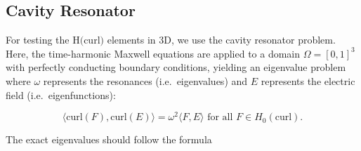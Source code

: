 \documentclass[manuscript,screen]{acmart}
\newcommand{\R}{\mathbb{R}}
\newcommand{\akg}[1]{\textcolor{blue}{\textbf{AG:} #1}}
\begin{document}


  \subsection{Cavity Resonator}

\noindent For testing the H$($curl$)$ elements in 3D, we use the cavity resonator problem.  Here, the time-harmonic Maxwell equations are applied to a domain $\Omega = [0,1]^3$ with perfectly conducting boundary conditions, yielding an eigenvalue problem where $\omega$ represents the resonances (i.e.\ eigenvalues) and $E$ represents the electric field (i.e.\ eigenfunctions):


\begin{equation}
    \langle \text{curl}(F), \text{curl}(E) \rangle = \omega^2 \langle F, E \rangle \text{ for all } F \in H_0(\text{curl}).
\end{equation}


\noindent The exact eigenvalues should follow the formula
\end{document}
